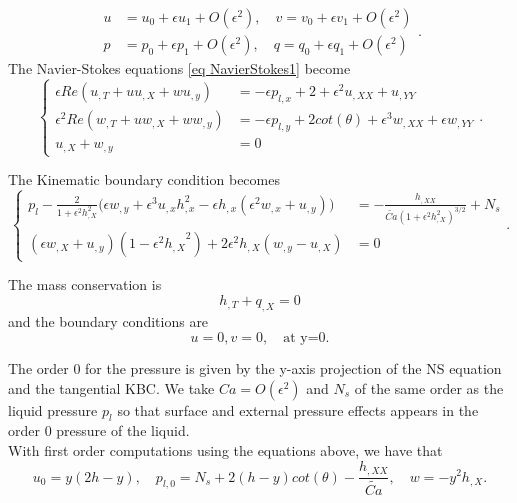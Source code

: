 \documentclass[12pt]{article}
\begin{document}
\begin{equation}
    \begin{aligned}
        u &= u_0 + \epsilon u_1 + O(\epsilon^2), \quad v=v_0+\epsilon v_1 + O(\epsilon^2) \\
        p &= p_0 + \epsilon p_1 + O(\epsilon^2), \quad q=q_0+\epsilon q_1 + O(\epsilon^2)
    \end{aligned}.
\end{equation}
The Navier-Stokes equations \eqref{eq NavierStokes1} become
\begin{equation}
    \left\{
    \begin{aligned}
        \epsilon Re(u_{,T}+ uu_{,X}+ wu_{,y}) &= -\epsilon p_{l,x} + 2 +\epsilon^2 u_{,XX} + u_{,YY}\\
        \epsilon^2 Re(w_{,T}+ uw_{,X}+ ww_{,y}) &= -\epsilon p_{l,y} + 2cot(\theta) +\epsilon^3 w_{,XX} + \epsilon w_{,YY}\\
        u_{,X}+w_{,y}&=0
    \end{aligned}
    \right..
\end{equation}

The Kinematic boundary condition becomes
\begin{equation}
\left\{
    \begin{aligned}
        p_l-\frac{2}{1+\epsilon^2h_{,X}^2}\Big( \epsilon w_{,y}+\epsilon^3 u_{,x}h_{,x}^2 - \epsilon h_{,x}(\epsilon^2 w_{,x}+u_{,y})\Big) &=-\frac{h_{,XX}}{\tilde{Ca}(1+\epsilon^2 h_{,X}^2)^{3/2}}+N_s\\
        (\epsilon w_{,X} + u_{,y})(1-{\epsilon^2 h_{,X}}^2)+2\epsilon^2h_{,X}(w_{,y}-u_{,X})&=0
    \end{aligned}
    \right..
\end{equation}

The mass conservation is $$h_{,T}+q_{,X}=0$$
and the boundary conditions are $$u=0, v=0,\quad \text{at y=0.}$$

The order 0 for the pressure is given by the y-axis projection of the NS equation and the tangential KBC. We take $Ca=O(\epsilon^2)$ and $N_s$ of the same order as the liquid pressure $p_l$ so that surface and external pressure effects appears in the order 0 pressure of the liquid.
\\

With first order computations using the equations above, we have that 
\begin{equation}
    u_0 = y(2h-y), \quad p_{l,0} = N_s + 2(h-y)cot(\theta)-\frac{h_{,XX}}{\tilde{Ca}},\quad w = -y^2h_{,X}.
\end{equation}
\end{document}
